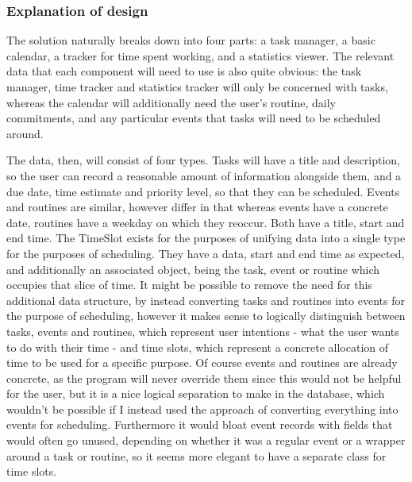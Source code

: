 \documentclass{article}
\begin{document}
\subsubsection{Explanation of design}
The solution naturally breaks down into four parts:
a task manager,
a basic calendar,
a tracker for time spent working,
and a statistics viewer.
The relevant data that each component will need to use is also quite obvious:
the task manager, time tracker and statistics tracker will only be concerned with tasks,
whereas the calendar will additionally need the user's routine, daily commitments,
and any particular events that tasks will need to be scheduled around.

The data, then, will consist of four types.
Tasks will have a title and description,
so the user can record a reasonable amount of information alongside them,
and a due date, time estimate and priority level,
so that they can be scheduled.
Events and routines are similar,
however differ in that whereas events have a concrete date,
routines have a weekday on which they reoccur.
Both have a title, start and end time.
The TimeSlot exists for the purposes of unifying data into a single type for the purposes of scheduling.
They have a data, start and end time as expected,
and additionally an associated object,
being the task, event or routine which occupies that slice of time.
It might be possible to remove the need for this additional data structure,
by instead converting tasks and routines into events for the purpose of scheduling,
however it makes sense to logically distinguish between tasks, events and routines,
which represent user intentions -
what the user wants to do with their time -
and time slots,
which represent a concrete allocation of time to be used for a specific purpose.
Of course events and routines are already concrete,
as the program will never override them since this would not be helpful for the user,
but it is a nice logical separation to make in the database,
which wouldn't be possible if I instead used the approach of converting everything into events for scheduling.
Furthermore it would bloat event records with fields that would often go unused,
depending on whether it was a regular event or a wrapper around a task or routine,
so it seems more elegant to have a separate class for time slots.
\end{document}
